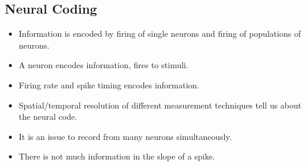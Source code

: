 \documentclass[a4paper, 12pt]{article}
\begin{document}
\subsection{Neural Coding}
\begin{itemize}[noitemsep,nolistsep]
	\item Information is encoded by firing of single neurons and firing of populations of neurons.
	\item A neuron encodes information, fires to stimuli.
	\item Firing rate and spike timing encodes information.
	\item Spatial/temporal resolution of different measurement techniques tell us about the neural code.
	\item It is an issue to record from many neurons simultaneously.
	\item There is not much information in the slope of a spike.
\end{itemize}
\end{document}
